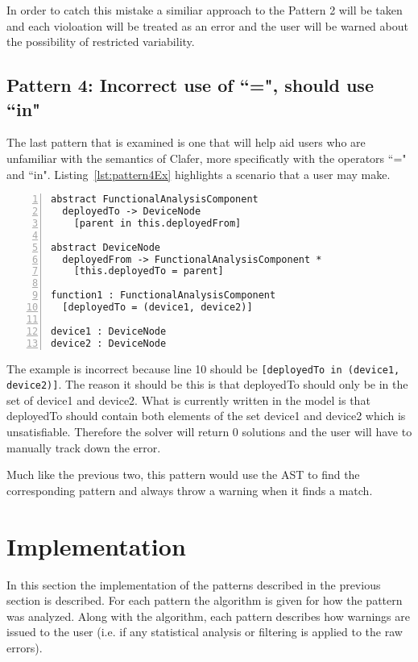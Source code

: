 \documentclass[10pt,oneside]{IEEEtran}
\begin{document}
In order to catch this mistake a similiar approach to the Pattern 2 will be taken and each violoation will be treated as an error and the user will be warned about the possibility of restricted variability.

\subsection{Pattern 4: Incorrect use of ``=", should use ``in"}
The last pattern that is examined is one that will help aid users who are unfamiliar with the semantics of Clafer, more specificatly with the operators ``=" and ``in". Listing~\ref{lst:pattern4Ex} highlights a scenario that a user may make.
\begin{lstlisting}[label={lst:pattern4Ex},caption={Example of Pattern 4},numbers=left]
abstract FunctionalAnalysisComponent
  deployedTo -> DeviceNode
    [parent in this.deployedFrom]

abstract DeviceNode
  deployedFrom -> FunctionalAnalysisComponent *
    [this.deployedTo = parent]

function1 : FunctionalAnalysisComponent
  [deployedTo = (device1, device2)]

device1 : DeviceNode
device2 : DeviceNode
\end{lstlisting}

The example is incorrect because line 10 should be \lstinline$[deployedTo in (device1, device2)]$. The reason it should be this is that deployedTo should only be in the set of device1 and device2. What is currently written in the model is that deployedTo should contain both elements of the set device1 and device2 which is unsatisfiable. Therefore the solver will return 0 solutions and the user will have to manually track down the error.

Much like the previous two, this pattern would use the AST to find the corresponding pattern and always throw a warning when it finds a match.

\section{Implementation}
\label{sec:implementation}
In this section the implementation of the patterns described in the previous section is described. For each pattern the algorithm is given for how the pattern was analyzed. Along with the algorithm, each pattern describes how warnings are issued to the user (i.e. if any statistical analysis or filtering is applied to the raw errors).
\end{document}
